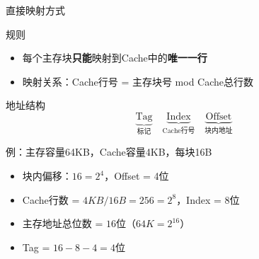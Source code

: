 \documentclass[10pt, aspectratio=169]{beamer}
\begin{document}
\begin{frame}[t]{直接映射方式}
    \begin{block}{规则}
        \begin{itemize}
            \item 每个主存块\textbf{只能}映射到Cache中的\textbf{唯一一行}
            \item 映射关系：Cache行号 = 主存块号 mod Cache总行数
        \end{itemize}
    \end{block}
    \vspace{0.3em}
    \begin{block}{地址结构}
        \[
            \underbrace{\text{Tag}}_{\text{标记}} \quad
            \underbrace{\text{Index}}_{\text{Cache行号}} \quad
            \underbrace{\text{Offset}}_{\text{块内地址}}
        \]
    \end{block}
    \vspace{0.3em}
    \begin{exampleblock}{例：主存容量64KB，Cache容量4KB，每块16B}
        \begin{itemize}
            \item 块内偏移：$16 = 2^4$，Offset = 4位
            \item Cache行数 = $4KB / 16B = 256 = 2^8$，Index = 8位
            \item 主存地址总位数 = $16$位（$64K = 2^{16}$）
            \item Tag = $16 - 8 - 4 = 4$位
        \end{itemize}
    \end{exampleblock}
\end{frame}
\end{document}
